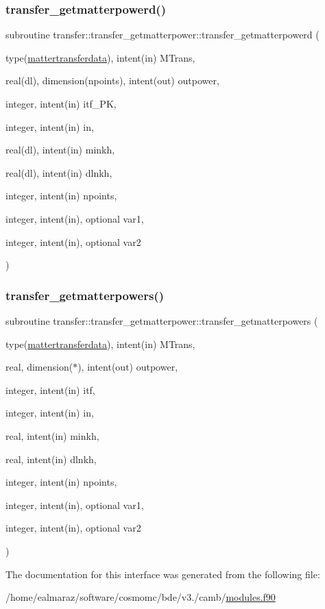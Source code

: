 \subsubsection{\texorpdfstring{transfer\+\_\+getmatterpowerd()}{transfer\_getmatterpowerd()}}
{\footnotesize\ttfamily subroutine transfer\+::transfer\+\_\+getmatterpower\+::transfer\+\_\+getmatterpowerd (\begin{DoxyParamCaption}\item[{type(\mbox{\hyperlink{structtransfer_1_1mattertransferdata}{mattertransferdata}}), intent(in)}]{M\+Trans,  }\item[{real(dl), dimension(npoints), intent(out)}]{outpower,  }\item[{integer, intent(in)}]{itf\+\_\+\+PK,  }\item[{integer, intent(in)}]{in,  }\item[{real(dl), intent(in)}]{minkh,  }\item[{real(dl), intent(in)}]{dlnkh,  }\item[{integer, intent(in)}]{npoints,  }\item[{integer, intent(in), optional}]{var1,  }\item[{integer, intent(in), optional}]{var2 }\end{DoxyParamCaption})}

\mbox{\label{interfacetransfer_1_1transfer__getmatterpower_a40ca4d612572e58242f5e0ec92864f37}} 
\subsubsection{\texorpdfstring{transfer\+\_\+getmatterpowers()}{transfer\_getmatterpowers()}}
{\footnotesize\ttfamily subroutine transfer\+::transfer\+\_\+getmatterpower\+::transfer\+\_\+getmatterpowers (\begin{DoxyParamCaption}\item[{type(\mbox{\hyperlink{structtransfer_1_1mattertransferdata}{mattertransferdata}}), intent(in)}]{M\+Trans,  }\item[{real, dimension($\ast$), intent(out)}]{outpower,  }\item[{integer, intent(in)}]{itf,  }\item[{integer, intent(in)}]{in,  }\item[{real, intent(in)}]{minkh,  }\item[{real, intent(in)}]{dlnkh,  }\item[{integer, intent(in)}]{npoints,  }\item[{integer, intent(in), optional}]{var1,  }\item[{integer, intent(in), optional}]{var2 }\end{DoxyParamCaption})}



The documentation for this interface was generated from the following file\+:\begin{DoxyCompactItemize}
\item 
/home/ealmaraz/software/cosmomc/bde/v3./camb/\mbox{\hyperlink{modules_8f90}{modules.\+f90}}\end{DoxyCompactItemize}

